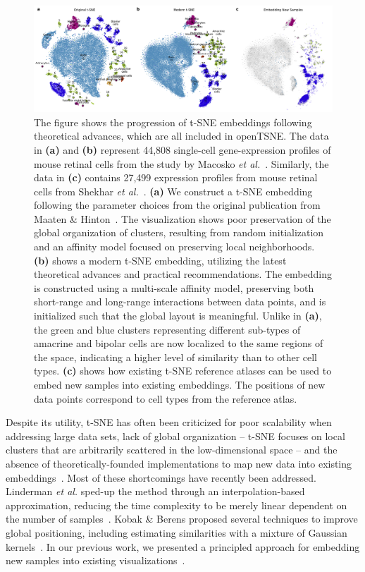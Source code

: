 \documentclass[twocolumn]{bmcart}
\newcommand{\opentsne}{\textsf{openTSNE}}
\begin{document}
\begin{figure}[htbp]
  \includegraphics[width=\textwidth]{macosko2015}
  \caption{\label{fig:macosko}The figure shows the progression of t-SNE embeddings following theoretical advances, which are all included in \opentsne. The data in \textbf{(a)} and \textbf{(b)} represent 44,808 single-cell gene-expression profiles of mouse retinal cells from the study by Macosko \textit{et al.}~\cite{macosko2015highly}. Similarly, the data in \textbf{(c)} contains 27,499 expression profiles from mouse retinal cells from Shekhar \textit{et al.}~\cite{shekhar2016comprehensive}. \textbf{(a)} We construct a t-SNE embedding following the parameter choices from the original publication from Maaten \& Hinton~\cite{maaten2008visualizing}. The visualization shows poor preservation of the global organization of clusters, resulting from random initialization and an affinity model focused on preserving local neighborhoods. \textbf{(b)} shows a modern t-SNE embedding, utilizing the latest theoretical advances and practical recommendations. The embedding is constructed using a multi-scale affinity model, preserving both short-range and long-range interactions between data points, and is initialized such that the global layout is meaningful. Unlike in \textbf{(a)}, the green and blue clusters representing different sub-types of amacrine and bipolar cells are now localized to the same regions of the space, indicating a higher level of similarity than to other cell types. \textbf{(c)} shows how existing t-SNE reference atlases can be used to embed new samples into existing embeddings. The positions of new data points correspond to cell types from the reference atlas.}
\end{figure}

Despite its utility, t-SNE has often been criticized for poor scalability when
addressing large data sets, lack of global organization -- t-SNE focuses on local
clusters that are arbitrarily scattered in the low-dimensional space -- and the
absence of theoretically-founded implementations to map new data into existing
embeddings~\cite{ding2018interpretable,becht2019dimensionality}. Most of these
shortcomings have recently been addressed. Linderman \textit{et
al.} sped-up the method through an interpolation-based
approximation, reducing the time complexity to be merely linear dependent on
the number of samples~\cite{linderman2019fast}. Kobak \& Berens proposed
several techniques to improve global positioning, including estimating
similarities with a mixture of Gaussian kernels~\cite{kobak2019art}. In our previous work, we presented
a principled approach for embedding new samples into existing visualizations~\cite{policar2019embedding}.
\end{document}
